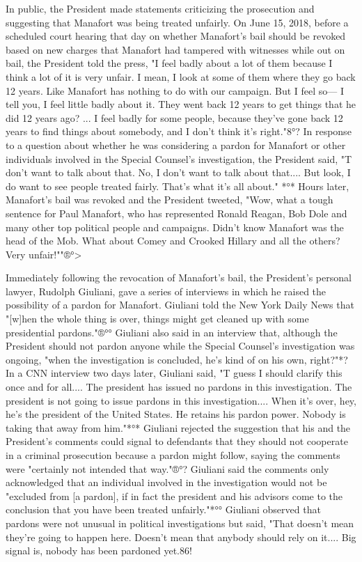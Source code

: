 In public, the President made statements criticizing the prosecution and suggesting that Manafort was being treated unfairly.
On June 15, 2018, before a scheduled court hearing that day on whether Manafort's bail should be revoked based on new charges that Manafort had tampered with witnesses while out on bail, the President told the press, "I feel badly about a lot of them because I think a lot of it is very unfair.
I mean, I look at some of them where they go back 12 years.
Like Manafort has nothing to do with our campaign.
But I feel so— I tell you, I feel little badly about it.
They went back 12 years to get things that he did 12 years ago? ...
I feel badly for some people, because they've gone back 12 years to find things about somebody, and I don't think it's right."8°?
In response to a question about whether he was considering a pardon for Manafort or other individuals involved in the Special Counsel's investigation, the President said, "T don't want to talk about that.
No, I don't want to talk about that....
But look, I do want to see people treated fairly.
That's what it's all about." *°*
Hours later, Manafort's bail was revoked and the President tweeted, "Wow, what a tough sentence for Paul Manafort, who has represented Ronald Reagan, Bob Dole and many other top political people and campaigns.
Didn't know Manafort was the head of the Mob.
What about Comey and Crooked Hillary and all the others? Very unfair!""®°>

Immediately following the revocation of Manafort's bail, the President's personal lawyer, Rudolph Giuliani, gave a series of interviews in which he raised the possibility of a pardon for Manafort.
Giuliani told the New York Daily News that "[w]hen the whole thing is over, things might get cleaned up with some presidential pardons."®°°
Giuliani also said in an interview that, although the President should not pardon anyone while the Special Counsel's investigation was ongoing, "when the investigation is concluded, he's kind of on his own, right?"*?
In a CNN interview two days later, Giuliani said, "T guess I should clarify this once and for all....
The president has issued no pardons in this investigation.
The president is not going to issue pardons in this investigation.... When it's over, hey, he's the president of the United States.
He retains his pardon power.
Nobody is taking that away from him."*°*
Giuliani rejected the suggestion that his and the President's comments could signal to defendants that they should not cooperate in a criminal prosecution because a pardon might follow, saying the comments were "certainly not intended that way."®°? Giuliani said the comments only acknowledged that an individual involved in the investigation would not be "excluded from [a pardon], if in fact the president and his advisors come to the conclusion that you have been treated unfairly."*°°
Giuliani observed that pardons were not unusual in political investigations but said, "That doesn't mean they're going to happen here.
Doesn't mean that anybody should rely on it....
Big signal is, nobody has been pardoned yet.86!

